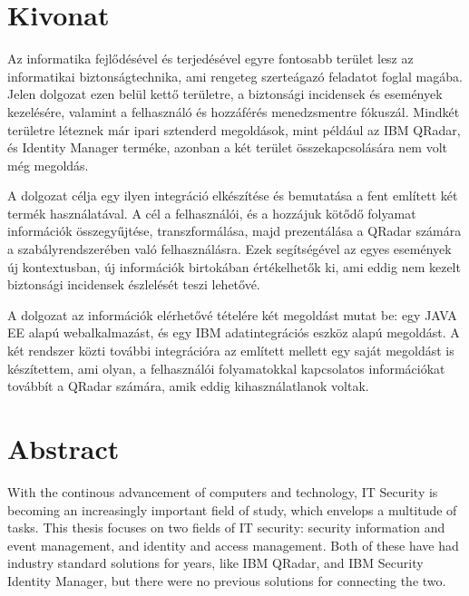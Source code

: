 \setcounter{page}{1}

\selecthungarian

\chapter*{Kivonat}

Az informatika fejlődésével és terjedésével egyre fontosabb terület lesz az informatikai biztonságtechnika, ami rengeteg szerteágazó feladatot foglal magába. Jelen dolgozat ezen belül kettő területre, a biztonsági incidensek és események kezelésére, valamint a felhasználó és hozzáférés menedzsmentre fókuszál. Mindkét területre léteznek már ipari sztenderd megoldások, mint például az IBM QRadar, és Identity Manager terméke, azonban a két terület összekapcsolására nem volt még megoldás. 

A dolgozat célja egy ilyen integráció elkészítése és bemutatása a fent említett két termék használatával. A cél a felhasználói, és a hozzájuk kötődő folyamat információk összegyűjtése, transzformálása, majd prezentálása a QRadar számára a szabályrendszerében való felhasználásra. Ezek segítségével az egyes események új kontextusban, új információk birtokában értékelhetők ki, ami eddig nem kezelt biztonsági incidensek észlelését teszi lehetővé.


A dolgozat az információk elérhetővé tételére két megoldást mutat be: egy JAVA EE alapú webalkalmazást, és egy IBM adatintegrációs eszköz alapú megoldást. A két rendszer közti további integrációra az említett mellett egy saját megoldást is készítettem, ami olyan, a felhasználói folyamatokkal kapcsolatos információkat továbbít a QRadar számára,  amik eddig kihasználatlanok voltak.


\vfill
\selectenglish


\chapter*{Abstract}

With the continous advancement of computers and technology, IT Security is becoming an increasingly important field of study, which envelops a multitude of tasks. This thesis focuses on two fields of IT security: security information and event management, and identity and access management. Both of these have had industry standard solutions for years, like IBM QRadar, and IBM Security Identity Manager, but there were no previous solutions for connecting the two.

